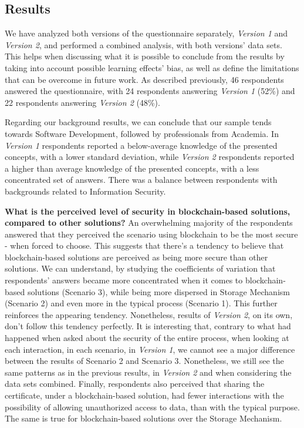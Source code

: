 \subsection{Results}

We have analyzed both versions of the questionnaire separately, \textit{Version 1} and \textit{Version 2}, and performed a combined analysis, with both versions' data sets. This helps when discussing what it is possible to conclude from the results by taking into account possible learning effects' bias, as well as define the limitations that can be overcome in future work. As described previously, 46 respondents answered the questionnaire, with 24 respondents answering \textit{Version 1} (52\%) and 22 respondents answering \textit{Version 2} (48\%).

Regarding our background results, we can conclude that our sample tends towards Software Development, followed by professionals from Academia. In \textit{Version 1} respondents reported a below-average knowledge of the presented concepts, with a lower standard deviation, while \textit{Version 2} respondents reported a higher than average knowledge of the presented concepts, with a less concentrated set of answers. There was a balance between respondents with backgrounds related to Information Security.

\textbf{What is the perceived level of security in blockchain-based solutions, compared to other solutions?} An overwhelming majority of the respondents answered that they perceived the scenario using blockchain to be the most secure - when forced to choose. This suggests that there's a tendency to believe that blockchain-based solutions are perceived as being more secure than other solutions. We can understand, by studying the coefficients of variation that respondents' answers became more concentrated when it comes to blockchain-based solutions (Scenario 3), while being more dispersed in Storage Mechanism (Scenario 2) and even more in the typical process (Scenario 1). This further reinforces the appearing tendency. Nonetheless, results of \textit{Version 2}, on its own, don't follow this tendency perfectly. It is interesting that, contrary to what had happened when asked about the security of the entire process, when looking at each interaction, in each scenario, in \textit{Version 1}, we cannot see a major difference between the results of Scenario 2 and Scenario 3. Nonetheless, we still see the same patterns as in the previous results, in \textit{Version 2} and when considering the data sets combined. Finally, respondents also perceived that sharing the certificate, under a blockchain-based solution, had fewer interactions with the possibility of allowing unauthorized access to data, than with the typical purpose. The same is true for blockchain-based solutions over the Storage Mechanism.

